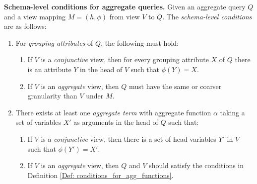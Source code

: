 
\begin{definition}
{\bf Schema-level conditions for aggregate queries.}
Given an aggregate query $Q$ and %
 a view mapping $M = (h, \phi)$ from view $V$ to $Q$. The {\em schema-level conditions} are as follows:
\begin{enumerate}
\item For \textit{grouping attributes} of $Q$, the following must hold:
\begin{enumerate}
\item If $V$ is a \textit{conjunctive} view, then for every grouping attribute $X$ of $Q$ there is an attribute $Y$ in the head of $V$ such that $\phi(Y) = X$.
\item If $V$ is an \textit{aggregate} view, then $Q$ must have the same or coarser granularity than $V$ under $M$.
\end{enumerate}
\item There exists at least one \textit{aggregate term }with aggregate function $\alpha$ taking a set of variables $X'$ as arguments in the head of $Q$ such that:
\begin{enumerate}
\item If $V$ is a \textit{conjunctive} view, then there is a set of head variables $Y'$ in $V$ such that $\phi(Y') = X'$.
\item If $V$ is an \textit{aggregate} view, then $Q$ and $V$ should satisfy the conditions in Definition \ref{Def: conditions_for_agg_functions}.





\end{enumerate}
\end{enumerate}
\end{definition}
